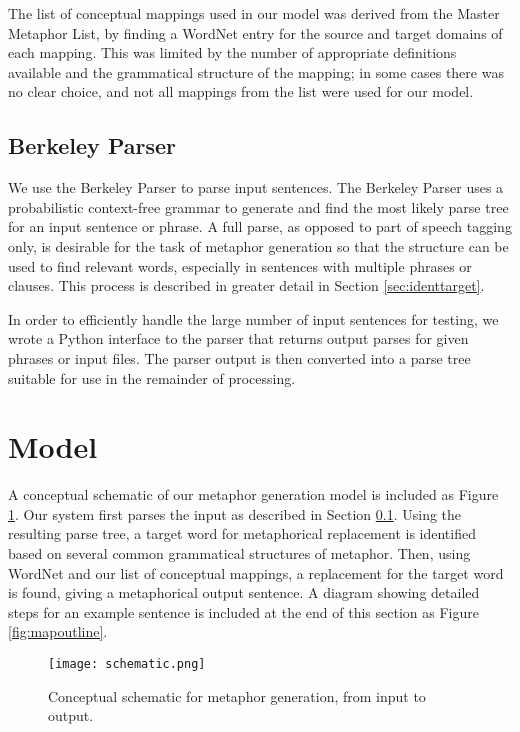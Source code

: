\documentclass[12pt]{article}
\begin{document}
The list of conceptual mappings used in our model was derived from the Master Metaphor List, by finding a WordNet entry for the source and target domains of each mapping.  This was limited by the number of appropriate definitions available and the grammatical structure of the mapping; in some cases there was no clear choice, and not all mappings from the list were used for our model.

\subsection{Berkeley Parser}
\label{sec:berkeleyparser}

We use the Berkeley Parser \cite{berkeleyparser} to parse input sentences.  The Berkeley Parser uses a probabilistic context-free grammar to generate and find the most likely parse tree for an input sentence or phrase.  A full parse, as opposed to part of speech tagging only, is desirable for the task of metaphor generation so that the structure can be used to find relevant words, especially in sentences with multiple phrases or clauses.  This process is described in greater detail in Section \ref{sec:identtarget}.

In order to efficiently handle the large number of input sentences for testing, we wrote a Python interface to the parser that returns output parses for given phrases or input files.  The parser output is then converted into a parse tree suitable for use in the remainder of processing.

\section{Model}

A conceptual schematic of our metaphor generation model is included as Figure \ref{fig:schematic}.  Our system first parses the input as described in Section \ref{sec:berkeleyparser}.  Using the resulting parse tree, a target word for metaphorical replacement is identified based on several common grammatical structures of metaphor.  Then, using WordNet and our list of conceptual mappings, a replacement for the target word is found, giving a metaphorical output sentence.  A diagram showing detailed steps for an example sentence is included at the end of this section as Figure \ref{fig:mapoutline}.

\begin{figure}[h]
	\centering
	\texttt{[image: schematic.png]}
	\caption{Conceptual schematic for metaphor generation, from input to output.}
	\label{fig:schematic}
\end{figure}
\end{document}
